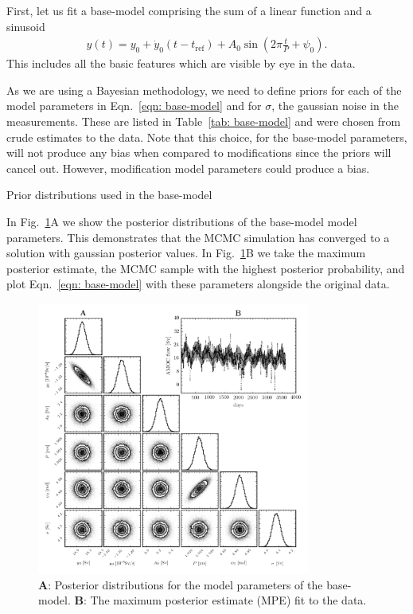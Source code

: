 \documentclass{article}
\newcommand{\tref}{t_{\textrm{ref}}}
\begin{document}
First, let us fit a base-model comprising the sum of a linear function and a
sinusoid
\begin{align}
y(t) = y_0 + \dot{y}_0(t - \tref) + A_0 \sin\left(2\pi \frac{t}{P} + \psi_0\right).
\label{eqn: base-model}
\end{align}
This includes all the basic features which are visible by eye in the data.

As we are using a Bayesian methodology, we need to define priors for each of
the model parameters in Eqn.~\eqref{eqn: base-model} and for $\sigma$, the
gaussian noise in the measurements. These are listed in Table~\ref{tab: base-model}
and were chosen from crude estimates to the data. Note that this choice, for the
base-model parameters, will not produce any bias when compared to modifications
since the priors will cancel out. However, modification model parameters could
produce a bias.
\begin{table}[htb]
\centering
\caption{Prior distributions used in the base-model}
\label{tab: base-model}

\end{table}

In Fig.~\ref{fig: base-model}A we show the posterior distributions of the
base-model model parameters. This demonstrates that the MCMC simulation has
converged to a solution with gaussian posterior values. In Fig.~\ref{fig: base-model}B
we take the maximum posterior estimate, the MCMC sample with the highest posterior
probability, and plot Eqn.~\eqref{eqn: base-model} with these parameters alongside
the original data.
\begin{figure}[htb]
\centering
\includegraphics[width=0.8\textwidth]{img/BasicSinusoid_PosteriorWithFit}
\caption{\textbf{A}: Posterior distributions for the model parameters of the
base-model. \textbf{B}: The maximum posterior estimate (MPE) fit to the data.}
\label{fig: base-model}
\end{figure}
\end{document}
